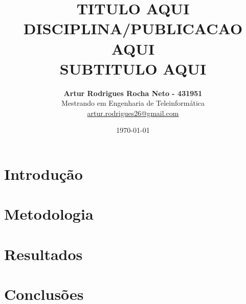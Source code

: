 \documentclass[a4paper]{article}
\title{
    TITULO AQUI \\
    DISCIPLINA/PUBLICACAO AQUI \\
    \large SUBTITULO AQUI
}
\author{
    \textbf{Artur Rodrigues Rocha Neto - 431951} \\
    Mestrando em Engenharia de Teleinformática \\
    \url{artur.rodrigues26@gmail.com} \\
}
\date{\today}
\begin{document}
\maketitle

\section{Introdução}\label{sec-introducao}

\section{Metodologia}\label{sec-metodologia}

\section{Resultados}\label{sec-resultados}

\section{Conclusões}\label{sec-conclusoes}

\begin{footnotesize}
    
    
\end{footnotesize}
\end{document}
